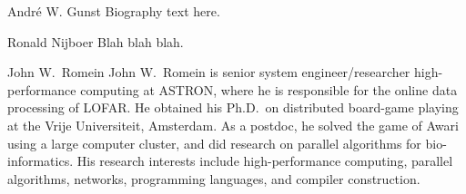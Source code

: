 \documentclass[journal]{IEEEtran}
\begin{document}
% 

\begin{IEEEbiography}{Andr\'{e} W. Gunst}
Biography text here.
\end{IEEEbiography}

\begin{IEEEbiography}{Ronald Nijboer}
Blah blah blah.
\end{IEEEbiography}




\begin{IEEEbiography}{John W.\ Romein}
John W.\ Romein is senior system engineer/researcher high-performance
computing at ASTRON, where he is responsible for the online data processing
of LOFAR.
He obtained his Ph.D.\ on distributed board-game playing at the Vrije
Universiteit, Amsterdam.
As a postdoc, he solved the game of Awari using a large computer cluster,
and did research on parallel algorithms for bio-informatics.
His research interests include high-performance computing, parallel algorithms,
networks, programming languages, and compiler construction.
\end{IEEEbiography}






\end{document}
